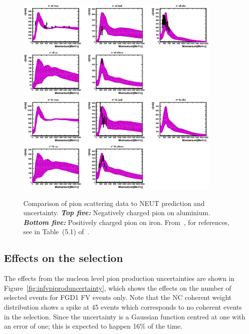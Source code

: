 \begin{figure}[ht]
  \center
  \includegraphics[width=0.9\textwidth]{T2K-TN-254/images/systematics/al_piM_all.eps}
  \includegraphics[width=0.9\textwidth]{T2K-TN-254/images/systematics/fe_piP_all.eps} 
  \caption[Comparison of pion scattering data to NEUT prediction and
  uncertainty]{Comparison of pion scattering data to \Gls{NEUT}
    prediction and uncertainty.  \textbf{\textit{Top five:}}
    Negatively charged pion on aluminium.  \textbf{\textit{Bottom
        five:}} Positively charged pion on iron.  From~\cite{FSITalk},
    for references, see in Table~(5.1) of~\cite{TN033}.}
  \label{fig:fsiheavy}
\end{figure}
\clearpage

\subsection{Effects on the selection}

The effects from the nucleon level pion production uncertainties are
shown in Figure~\ref{fig:infvpiproduncertainty}, which shows the
effects on the number of selected events for \Gls{FGD}1 \Gls{FV}
events only. Note that the \Gls{NC} coherent weight distribution shows
a spike at 45 events which corresponds to no coherent events in the
selection. Since the uncertainty is a Gaussian function centred at one
with an error of one; this is expected to happen 16\% of the time.

